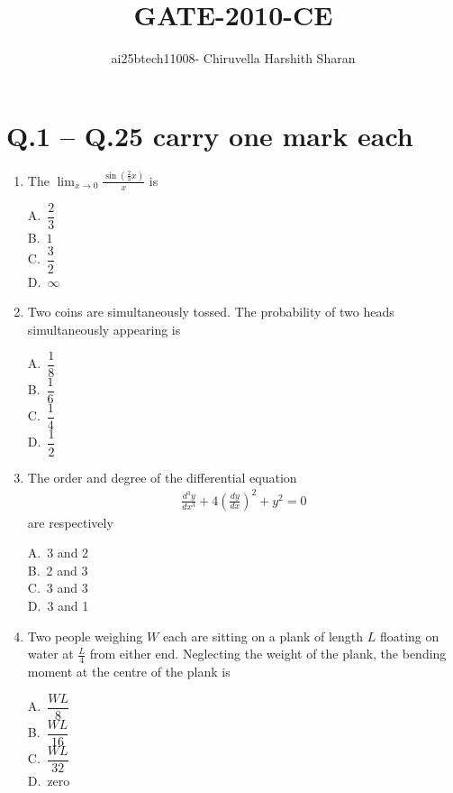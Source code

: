 \documentclass[journal,12pt,onecolumn]{exam}
\title{\huge {GATE-2010-CE}}
\author{ai25btech11008- Chiruvella Harshith Sharan}
\date{}
\theoremstyle{remark}
\begin{document}
\maketitle

\setlength{\parindent}{0pt}
\setlength{\parskip}{0.5cm}

\section*{Q.1 -- Q.25 carry one mark each}

\begin{enumerate}
\item The $\displaystyle \lim_{x \to 0} \frac{\sin \left( \frac{2}{3} x \right)}{x}$ is  
\hfill{}
\begin{multicols}{4}
A.\ $\dfrac{2}{3}$ \\
B.\ $1$ \\
C.\ $\dfrac{3}{2}$ \\
D.\ $\infty$
\end{multicols}
\noindent\item Two coins are simultaneously tossed. The probability of two heads simultaneously appearing is \hfill{}
\begin{multicols}{4}
A.\ $\dfrac{1}{8}$ \\
B.\ $\dfrac{1}{6}$ \\
C.\ $\dfrac{1}{4}$ \\
D.\ $\dfrac{1}{2}$
\end{multicols}

\noindent\item The order and degree of the differential equation 
\begin{align*}
\frac{d^3 y}{dx^3} + 4 \left( \frac{dy}{dx} \right)^2 + y^2 = 0
\end{align*}
are respectively \hfill{}
\begin{multicols}{4}
A.\ 3 and 2 \\
B.\ 2 and 3 \\
C.\ 3 and 3 \\
D.\ 3 and 1
\end{multicols}

\noindent\item Two people weighing $W$ each are sitting on a plank of length $L$ floating on water at $\frac{L}{4}$ from either end. Neglecting the weight of the plank, the bending moment at the centre of the plank is \hfill{}
\begin{multicols}{4}
A.\ $\dfrac{WL}{8}$ \\
B.\ $\dfrac{WL}{16}$ \\
C.\ $\dfrac{WL}{32}$ \\
D.\ zero
\end{multicols}


\end{enumerate}
\end{document}
